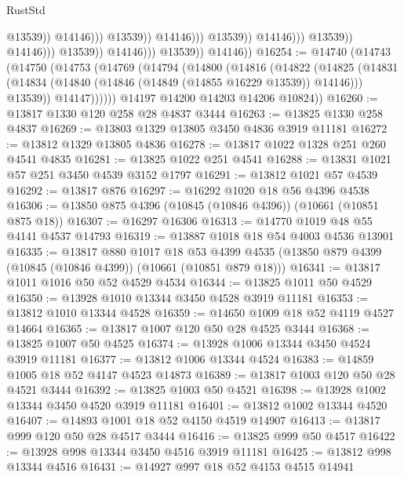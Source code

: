 \begin{lexlean}{RustStd}
\begin{coremodule}
                                                              @13539))
                                                          @14146)))
                                                    @13539))
                                                @14146)))
                                          @13539))
                                      @14146)))
                                @13539))
                            @14146)))
                      @13539))
                  @14146)))
            @13539))
        @14146))
@16254 := @14740
    (@14743
      (@14750
        (@14753
          (@14769
            (@14794
              (@14800
                (@14816
                  (@14822
                    (@14825
                      (@14831
                        (@14834 (@14840 (@14846 (@14849 (@14855 @16229 @13539)) @14146)))
                        @13539))
                    @14147))))))
        @14197
        @14200
        @14203
        @14206
        @10824))
@16260 := @13817 @1330 @120 @258 @28 @4837 @3444
@16263 := @13825 @1330 @258 @4837
@16269 := @13803 @1329 @13805 @3450 @4836 @3919 @11181
@16272 := @13812 @1329 @13805 @4836
@16278 := @13817 @1022 @1328 @251 @260 @4541 @4835
@16281 := @13825 @1022 @251 @4541
@16288 := @13831 @1021 @57 @251 @3450 @4539 @3152 @1797
@16291 := @13812 @1021 @57 @4539
@16292 := @13817 @876
@16297 := @16292 @1020 @18 @56 @4396 @4538
@16306 := @13850 @875 @4396 (@10845 (@10846 @4396)) (@10661 (@10851 @875 @18))
@16307 := @16297 @16306
@16313 := @14770 @1019 @48 @55 @4141 @4537 @14793
@16319 := @13887 @1018 @18 @54 @4003 @4536 @13901
@16335 := @13817
    @880
    @1017
    @18
    @53
    @4399
    @4535
    (@13850 @879 @4399 (@10845 (@10846 @4399)) (@10661 (@10851 @879 @18)))
@16341 := @13817 @1011 @1016 @50 @52 @4529 @4534
@16344 := @13825 @1011 @50 @4529
@16350 := @13928 @1010 @13344 @3450 @4528 @3919 @11181
@16353 := @13812 @1010 @13344 @4528
@16359 := @14650 @1009 @18 @52 @4119 @4527 @14664
@16365 := @13817 @1007 @120 @50 @28 @4525 @3444
@16368 := @13825 @1007 @50 @4525
@16374 := @13928 @1006 @13344 @3450 @4524 @3919 @11181
@16377 := @13812 @1006 @13344 @4524
@16383 := @14859 @1005 @18 @52 @4147 @4523 @14873
@16389 := @13817 @1003 @120 @50 @28 @4521 @3444
@16392 := @13825 @1003 @50 @4521
@16398 := @13928 @1002 @13344 @3450 @4520 @3919 @11181
@16401 := @13812 @1002 @13344 @4520
@16407 := @14893 @1001 @18 @52 @4150 @4519 @14907
@16413 := @13817 @999 @120 @50 @28 @4517 @3444
@16416 := @13825 @999 @50 @4517
@16422 := @13928 @998 @13344 @3450 @4516 @3919 @11181
@16425 := @13812 @998 @13344 @4516
@16431 := @14927 @997 @18 @52 @4153 @4515 @14941

\end{coremodule}
\end{lexlean}
